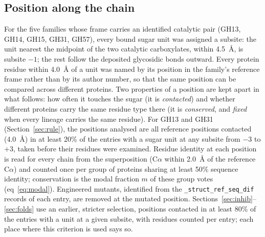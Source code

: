 \documentclass[preprint,12pt]{elsarticle}
\begin{document}
\subsection{Position along the chain}\label{sec:position}
For the five families whose frame carries an
identified catalytic pair (GH13, GH14, GH15, GH31, GH57), every bound sugar unit was
assigned a subsite: the unit nearest the midpoint of the two catalytic carboxylates,
within 4.5~\AA, is subsite $-1$; the rest follow the deposited glycosidic bonds outward.
Every protein residue within 4.0~\AA{} of a unit was named by its position in the
family's reference frame rather than by its author number, so that the same position can
be compared across different proteins. Two properties of a position are kept apart in what
follows: how often it touches the sugar (it is \emph{contacted}) and whether different
proteins carry the same residue type there (it is \emph{conserved}, and \emph{fixed} when
every lineage carries the same residue). For GH13 and GH31
(Section~\ref{sec:rule}), the positions analysed are all reference positions contacted
(4.0~\AA) in at least 20\% of the entries with a sugar unit at any subsite from $-3$ to
$+3$, taken before their residues were examined. Residue identity at each position is read
for every chain from the superposition (C$\alpha$ within 2.0~\AA{} of the reference
C$\alpha$) and counted once per group of proteins sharing at least 50\% sequence identity;
conservation is the modal fraction $m$ of these group votes (eq~\ref{eq:modal}). Engineered
mutants, identified from the \texttt{\_struct\_ref\_seq\_dif} records of each entry, are
removed at the mutated position. Sections~\ref{sec:inhib}--\ref{sec:folds} use an earlier,
stricter selection, positions contacted in at least 80\% of the entries with a unit at a
given subsite, with residues counted per entry; each place where this criterion is used
says so.
\end{document}
